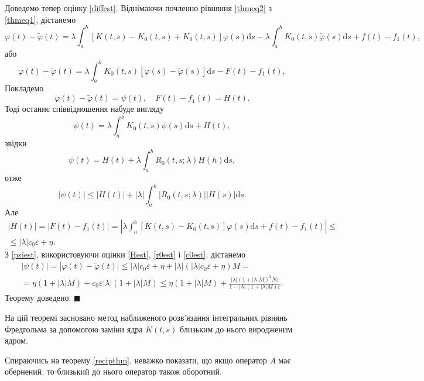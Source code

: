 \documentclass[14pt,twoside]{extreport}
\theoremstyle{mystyle}
\renewenvironment{proof}{{\bfseries Доведення.}}{$\blacksquare$}
\numberwithin{equation}{chapter}
\begin{document}
\begin{proof}
Доведемо тепер оцінку \eqref{diffest}. Віднімаючи почленно рівняння \eqref{thmeq2} з \eqref{thmeq1}, дістанемо
\[
\varphi(t) - \tilde{\varphi}(t) = \lambda \int_{a}^{b}[K(t, s) - K_0(t, s) + K_0(t, s)]\varphi(s) \mathrm{d}s - \lambda \int_{a}^{b} K_0(t, s) \tilde{\varphi}(s) \mathrm{d}s + f(t) - f_1(t),
\]
або
\[
\varphi(t) - \tilde{\varphi}(t) = \lambda \int_{a}^{b}K_0(t, s) [\varphi(s) - \tilde{\varphi}(s)]\mathrm{d}s - F(t) - f_1(t),
\]
Покладемо
\[
\varphi(t) - \tilde{\varphi}(t) = \psi(t), \quad F(t) - f_1(t) = H(t).
\]
Тоді останнє співвідношення набуде вигляду
\[
\psi(t) = \lambda \int_{a}^{b} K_0(t, s) \psi(s) \mathrm{d}s + H(t),
\]
звідки
\[
\psi(t) = H(t) + \lambda \int_{a}^{b} R_0 (t, s; \lambda) H(h) \mathrm{d}s,
\]
отже
\begin{equation}\label{psiest}
|\psi(t)| \leqslant |H(t)| + |\lambda| \int_{a}^{b} |R_0(t, s; \lambda)| |H(s)| \mathrm{d}s.
\end{equation}
Але
\begin{multline}\label{Hest}
|H(t)| = |F(t) - f_1(t)|= \left|\lambda\int_{a}^{b} [K(t, s)-K_0(t, s)] \varphi(s) \mathrm{d}s + f(t) - f_1(t)\right|\leqslant\\
\leqslant |\lambda| c_0 \varepsilon + \eta.
\end{multline}
З \eqref{psiest}, використовуючи оцінки \eqref{Hest}, \eqref{r0est} і \eqref{c0est}, дістанемо
\begin{multline*}
|\psi(t)| = |\varphi(t) - \tilde{\varphi}(t)|\leqslant|\lambda| c_0 \varepsilon + \eta + |\lambda| \left(|\lambda|c_0\varepsilon + \eta\right)M=\\
= \eta (1+|\lambda| M) + c_0\varepsilon |\lambda| (1 + |\lambda| M) \leqslant \eta(1+|\lambda| M) + \frac{|\lambda| (1 + |\lambda| M)^2 N\varepsilon}{1-|\lambda|(1+|\lambda| M)\varepsilon}.
\end{multline*}
Теорему доведено.
\end{proof}

На цій теоремі засновано метод наближеного розв'язання інтегральних рівнянь Фредгольма за допомогою заміни ядра $K(t, s)$ близьким до нього виродженим ядром.

Спираючись на теорему \ref{recipthm}, неважко показати, що якщо оператор $A$ має обернений, то близький до нього оператор також оборотний.
\end{document}
